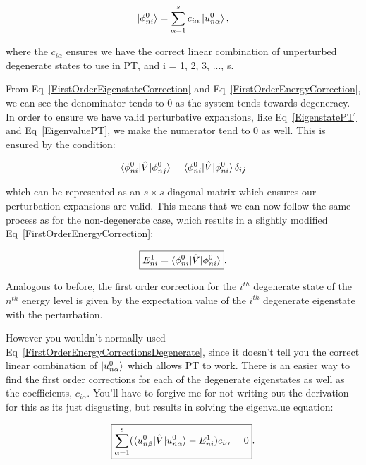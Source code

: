 \begin{equation}
    \ket{\phi^0_{ni}} = \sum^s_{\alpha = 1} c_{i\alpha} \ket{u^0_{n \alpha}}
    \label{LinearCombinationDegenerateStates},
\end{equation}

\noindent where the $c_{i\alpha}$ ensures we have the correct linear combination of unperturbed degenerate states to use in PT, and i = 1, 2, 3, ..., s.

\noindent From Eq~\ref{FirstOrderEigenstateCorrection} and Eq~\ref{FirstOrderEnergyCorrection}, we can see the denominator tends to 0 as the system tends towards degeneracy. In order to ensure we have valid perturbative expansions, like Eq~\ref{EigenstatePT} and Eq~\ref{EigenvaluePT}, we make the numerator tend to 0 as well. This is ensured by the condition:

\begin{equation}
    \braket{\phi^0_{ni} | \Hat{V} | \phi^0_{nj}} = \braket{\phi^0_{ni} | \Hat{V} | \phi^0_{ni}} \delta_{ij}
    \label{MatrixCondition}
\end{equation}

\noindent which can be represented as an $s \times s$ diagonal matrix which ensures our perturbation expansions are valid. This means that we can now follow the same process as for the non-degenerate case, which results in a slightly modified Eq~\ref{FirstOrderEnergyCorrection}:

\begin{equation}
    \boxed{E^1_{ni} = \braket{\phi^0_{ni} | \Hat{V} | \phi^0_{ni}}}.
    \label{FirstOrderEnergyCorrectionsDegenerate}
\end{equation}

\noindent Analogous to before, the first order correction for the $i^{th}$ degenerate state of the $n^{th}$ energy level is given by the expectation value of the $i^{th}$ degenerate eigenstate with the perturbation.

\noindent However you wouldn't normally used Eq~\ref{FirstOrderEnergyCorrectionsDegenerate}, since it doesn't tell you the correct linear combination of $\ket{u^0_{n \alpha}}$ which allows PT to work. There is an easier way to find the first order corrections for each of the degenerate eigenstates as well as the coefficients, $c_{i \alpha}$. You'll have to forgive me for not writing out the derivation for this as its just disgusting, but results in solving the eigenvalue equation:

\begin{equation}
    \boxed{\sum^s_{\alpha = 1} (\braket{u^0_{n\beta} | \Hat{V} | u^0_{n\alpha}} - E^1_{ni} )c_{i \alpha} = 0}.
    \label{DegenerateMatrixEquation}
\end{equation}

